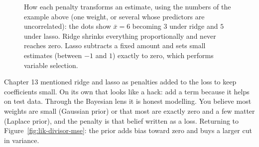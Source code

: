 \begin{figure}[H]
\centering
{}
\caption{How each penalty transforms an estimate, using the numbers of the example above
(one weight, or several whose predictors are uncorrelated): the dots show $\bar x = 6$
becoming $3$ under ridge and $5$ under lasso. Ridge shrinks everything proportionally and
never reaches zero. Lasso subtracts a fixed amount and sets small estimates (between $-1$
and $1$) exactly to zero, which performs variable selection.}
\label{fig:lik-shrinkage}
\end{figure}

\begin{intuitionbox}
Chapter 13 mentioned ridge and lasso as penalties added to the loss to keep
coefficients small. On its own that looks like a hack: add a term because it helps on
test data. Through the Bayesian lens it is honest modelling. You believe most
weights are small (Gaussian prior) or that most are exactly zero and a few matter
(Laplace prior), and the penalty is that belief written as a loss. Returning to
Figure~\ref{fig:lik-divisor-mse}: the prior adds bias toward zero and buys a larger cut
in variance.
\end{intuitionbox}

